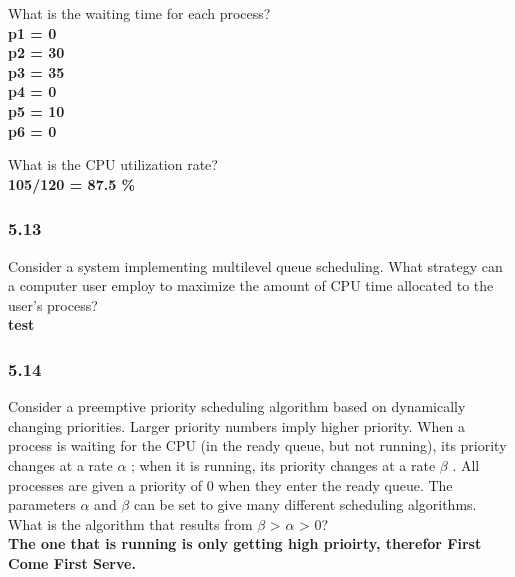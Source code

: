\documentclass[a4paper,10pt,titlepage]{report}
\begin{document}
\hspace{10mm}What is the waiting time for each process?\\
\hspace{20mm} \textbf{
\hspace{20mm} p1 = 0\\
\hspace{20mm} p2 = 30 \\
\hspace{20mm} p3 = 35 \\
\hspace{20mm} p4 = 0 \\
\hspace{20mm} p5 = 10 \\
\hspace{20mm} p6 = 0 \\
} 


\hspace{10mm}What is the CPU utilization rate?\\
\hspace{20mm} \textbf{
105/120 = 87.5 \%
} \\

\subsubsection{5.13}
Consider a system implementing multilevel queue scheduling. What strategy can a computer user employ to maximize the amount of CPU time allocated to the user's process?\\
\hspace{20mm} \textbf{
test
} \\


\subsubsection{5.14}
Consider a preemptive priority scheduling algorithm based on dynamically changing priorities. Larger priority numbers imply higher priority. When a process is waiting for the CPU (in the ready queue, but not running), its priority changes at a rate $\alpha$ ; when it is running, its priority changes at a rate $\beta$ . All processes are given a priority of 0 when they enter the ready queue. The parameters $\alpha$ and $\beta$ can be set to give many different scheduling algorithms.\\

\hspace{10mm}What is the algorithm that results from $\beta$ > $\alpha$ > 0?\\
\hspace{20mm} \textbf{
	The one that is running is only getting high prioirty, therefor First Come First Serve.
} \\
\end{document}
